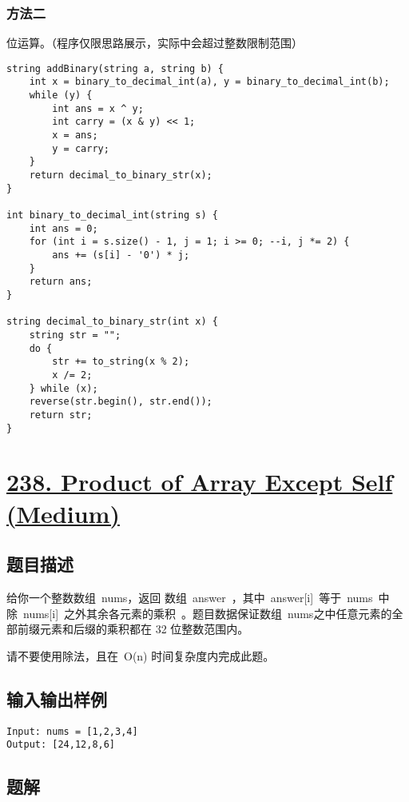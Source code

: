 \documentclass[lang=cn,10pt]{elegantbook}
\begin{document}
\subsubsection*{方法二}

位运算。（程序仅限思路展示，实际中会超过整数限制范围）

\begin{lstlisting}
string addBinary(string a, string b) {
	int x = binary_to_decimal_int(a), y = binary_to_decimal_int(b);
	while (y) {
		int ans = x ^ y;
		int carry = (x & y) << 1;
		x = ans;
		y = carry;
	}
	return decimal_to_binary_str(x);
}

int binary_to_decimal_int(string s) {
	int ans = 0;
	for (int i = s.size() - 1, j = 1; i >= 0; --i, j *= 2) {
		ans += (s[i] - '0') * j;
	}
	return ans;
}

string decimal_to_binary_str(int x) {
	string str = "";
	do {
		str += to_string(x % 2);
		x /= 2;
	} while (x);
	reverse(str.begin(), str.end());
	return str;
}
\end{lstlisting}

{\color{red}\section{\href{https://leetcode.cn/problems/product-of-array-except-self/}{238. Product of Array Except Self (Medium)}}} \label{ch9.238}

\subsection*{题目描述}

给你一个整数数组 nums，返回 数组 answer ，其中 answer[i] 等于 nums 中除 nums[i] 之外其余各元素的乘积 。题目数据保证数组 nums之中任意元素的全部前缀元素和后缀的乘积都在 32 位整数范围内。

请不要使用除法，且在 O(n) 时间复杂度内完成此题。

\subsection*{输入输出样例}

\begin{lstlisting}
Input: nums = [1,2,3,4]
Output: [24,12,8,6]
\end{lstlisting}

\subsection*{题解}
\end{document}

